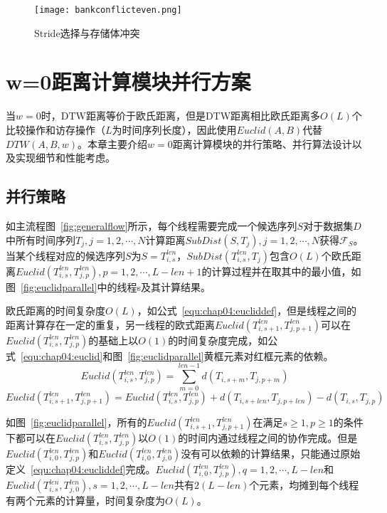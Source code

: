 \begin{figure}[H] %
	\centering
	\texttt{[image: bankconflicteven.png]}
	\caption{Stride选择与存储体冲突}
	\label{fig:BankConflictEven}
\end{figure}

\section{w=0距离计算模块并行方案}
\label{cha:chap04:myalg:euclid}

当$w=0$时，DTW距离等价于欧氏距离，但是DTW距离相比欧氏距离多$O(L)$个比较操作和访存操作（$L$为时间序列长度），因此使用$Euclid(A,B)$代替$DTW(A,B,w)$。本章主要介绍$w=0$距离计算模块的并行策略、并行算法设计以及实现细节和性能考虑。

\subsection{并行策略}
\label{cha:chap04:myalg:euclid:Strategies}

如主流程图~\ref{fig:generalflow}所示，每个线程需要完成一个候选序列$S$对于数据集$D$中所有时间序列$T_j,j=1,2,\cdots,N$计算距离$SubDist(S,T_j),j=1,2,\cdots,N$获得$\mathcal{F}_S$。当某个线程对应的候选序列$S$为$S=T_{i,s}^{len}$，$SubDist(T_{i,s}^{len},T_j)$包含$O(L)$个欧氏距离$Euclid(T_{i,s}^{len},T_{j,p}^{len}),p=1,2,\cdots,L-len+1$的计算过程并在取其中的最小值，如图~\ref{fig:euclidparallel}中的线程s及其计算结果。

欧氏距离的时间复杂度$O(L)$，如公式~\ref{equ:chap04:eucliddef}，但是线程之间的距离计算存在一定的重复，另一线程的欧式距离$Euclid(T_{i,s+1}^{len},T_{j,p+1}^{len})$可以在$Euclid(T_{i,s}^{len},T_{j,p}^{len})$的基础上以$O(1)$的时间复杂度完成，如公式~\ref{equ:chap04:euclid}和图~\ref{fig:euclidparallel}黄框元素对红框元素的依赖。
\begin{equation}
\label{equ:chap04:eucliddef}
Euclid(T_{i,s}^{len},T_{j,p}^{len}) = \sum_{m=0}^{len-1}d(T_{i,s+m},T_{j,p+m})
\end{equation}
\begin{equation}
\label{equ:chap04:euclid}
Euclid(T_{i,s+1}^{len},T_{j,p+1}^{len}) = Euclid(T_{i,s}^{len},T_{j,p}^{len}) + d(T_{i,s+len},T_{j,p+len}) - d(T_{i,s},T_{j,p})
\end{equation}

如图~\ref{fig:euclidparallel}，所有的$Euclid(T_{i,s+1}^{len},T_{j,p+1}^{len})$在满足$s\geq1,p\geq1$的条件下都可以在$Euclid(T_{i,s}^{len},T_{j,p}^{len})$以$O(1)$的时间内通过线程之间的协作完成。但是$Euclid(T_{i,0}^{len},T_{j,p}^{len})$和$Euclid(T_{i,0}^{len},T_{j,0}^{len})$没有可以依赖的计算结果，只能通过原始定义~\ref{equ:chap04:eucliddef}完成。$Euclid(T_{i,0}^{len},T_{j,p}^{len}),q=1,2,\cdots,L-len$和$Euclid(T_{i,s}^{len},T_{j,0}^{len}),s=1,2,\cdots,L-len$共有$2(L-len)$个元素，均摊到每个线程有两个元素的计算量，时间复杂度为$O(L)$。

